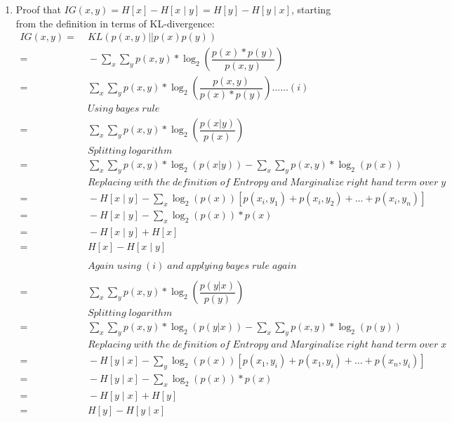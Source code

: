 \documentclass[english]{article}
\begin{document}
\begin{enumerate}
\item Proof that $IG(x,y) = H[x] - H[x \mid y] = H[y] - H[y \mid x]$,
  starting from the definition in terms of KL-divergence:
  \begin{align*}
    IG(x,y) =&\; KL\left(p(x,y)||p(x)p(y)\right) \\
    =&\; - \sum_x \sum_y p (x,y) * \log_2 (\dfrac{p(x) * p(y)}{p(x,y)}) \\
    =&\; \sum_x \sum_y p(x,y) * \log_2 (\dfrac {p(x,y)}{p(x) * p(y)}) \ldots\ldots (i) \\ 
    &\; Using \;bayes \;rule \\
    =&\; \sum_x \sum_y p(x,y) * \log_2(\dfrac{p(x|y)}{p(x)}) \\
    &\; Splitting \;logarithm \\
    =&\; \sum_x \sum_y p(x,y) * \log_2(p(x|y)) - \sum_x \sum_y p(x,y) * \log_2(p(x)) \\
    &\; Replacing \;with \;the \;definition \;of \;Entropy \;and \;Marginalize \;right \;hand \;term \;over \;y  \\
    =&\; -H[x \mid y] - \sum_x \log_2(p(x)) [p(x_i,y_1) + p(x_i,y_2) + \ldots + p(x_i,y_n)] \\
    =&\; -H[x \mid y] - \sum_x \log_2(p(x)) * p(x) \\
    =&\; -H[x \mid y] + H [x] \\
    =&\; H[x] - H[x \mid y] \\ \\
    &\;Again \;using \; (i)\; and \;applying \;bayes \;rule \;again \\ \\
    =&\; \sum_x \sum_y p(x,y) * \log_2(\dfrac{p(y|x)}{p(y)}) \\
    &\; Splitting \;logarithm \\
    =&\; \sum_x \sum_y p(x,y) * \log_2(p(y|x)) - \sum_x \sum_y p(x,y) * \log_2(p(y)) \\
    &\; Replacing \;with \;the \;definition \;of \;Entropy \;and \;Marginalize \;right \;hand \;term \;over \;x  \\
    =&\; -H[y \mid x] - \sum_y \log_2(p(x)) [p(x_1,y_i) + p(x_1,y_i) + \ldots + p(x_n,y_i)] \\
    =&\; -H[y \mid x] - \sum_x \log_2(p(x)) * p(x) \\
    =&\; -H[y \mid x] + H [y] \\
    =&\; H[y] - H[y \mid x]
    \end{align*}
\end{enumerate}
\end{document}
